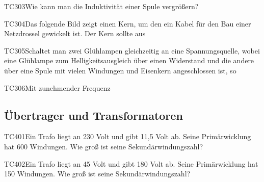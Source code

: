 \begin{question}{TC303}{Wie kann man die Induktivität einer Spule vergrößern?}
\end{question}

\begin{question}{TC304}{Das folgende Bild zeigt einen Kern, um den ein Kabel für den Bau einer Netzdrossel gewickelt ist. Der Kern sollte aus}
\end{question}

\begin{question}{TC305}{Schaltet man zwei Glühlampen gleichzeitig an eine Spannungsquelle, wobei eine Glühlampe zum Helligkeitsausgleich über einen Widerstand und die andere über eine Spule mit vielen Windungen und Eisenkern angeschlossen ist, so}
\end{question}

\begin{question}{TC306}{Mit zunehmender Frequenz}
\end{question}

\subsection{Übertrager und Transformatoren}

\begin{question}{TC401}{Ein Trafo liegt an 230 Volt und gibt 11,5 Volt ab. Seine Primärwicklung hat 600 Windungen. Wie groß ist seine Sekundärwindungszahl?}
\end{question}

\begin{question}{TC402}{Ein Trafo liegt an 45 Volt und gibt 180 Volt ab. Seine Primärwicklung hat 150 Windungen. Wie groß ist seine Sekundärwindungszahl?}
\end{question}

